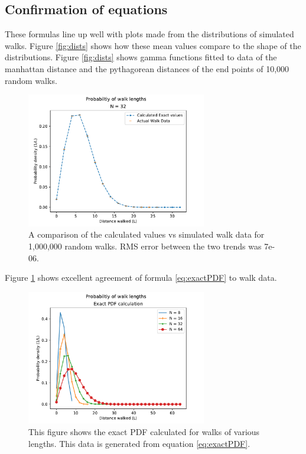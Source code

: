  	\subsection{Confirmation of equations}
	These formulas line up well with plots made from the distributions of simulated walks. 
	Figure \ref{fig:dists} shows how these mean values compare to the shape of the distributions. Figure \ref{fig:dists} shows gamma functions fitted to data of the manhattan distance and the pythagorean distances of the end points of 10,000 random walks. 
	\begin{figure}
	 	\centering
	 	\includegraphics[width = 0.7\textwidth]{figs/calculatedvssimulated.pdf}
	 	\caption{A comparison of the calculated values vs simulated walk data for 1,000,000 random walks. RMS error between the two trends was 7e-06. }
	 	\label{fig:exactproof}
	 	\end{figure}
	 	Figure \ref{fig:exactproof} shows excellent agreement of formula \ref{eq:exactPDF} to walk data. 
	 	
	 	
	 	\begin{figure}
	 	\centering
	 	\includegraphics[width = 0.7\textwidth]{figs/exactPDFdemo.pdf}
	 	\caption{This figure shows the exact PDF calculated for walks of various lengths. This data is generated from equation \ref{eq:exactPDF}.}
	 	\end{figure}
	 	
